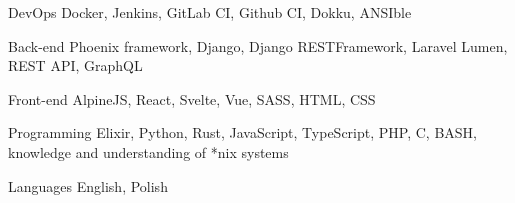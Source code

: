 

\begin{cvskills}

  \cvskill
    {DevOps} %
    {Docker, Jenkins, GitLab CI, Github CI, Dokku, ANSIble} %

  \cvskill
    {Back-end} %
    {Phoenix framework, Django, Django RESTFramework, Laravel Lumen, REST API, GraphQL} %

  \cvskill
    {Front-end} %
    {AlpineJS, React, Svelte, Vue, SASS, HTML, CSS} %

  \cvskill
    {Programming} %
    {Elixir, Python, Rust, JavaScript, TypeScript, PHP, C, BASH, knowledge and understanding of *nix systems} %

  \cvskill
    {Languages} %
    {English, Polish} %

\end{cvskills}
